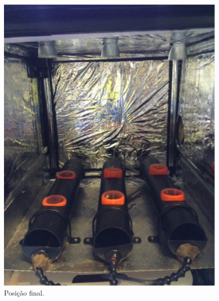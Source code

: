 \begin{figure}[H]
	\centering
	\includegraphics[width=14cm]{figuras/iluminaEstufa.png}
	\caption{Posição final.}
	\label{iluminaEstufa}
\end{figure}
